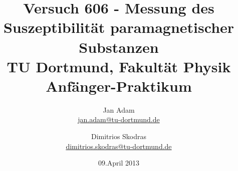 



\title{Versuch 606 - Messung des Suszeptibilität paramagnetischer Substanzen\\				%
\large TU Dortmund, Fakultät Physik\\ 
\normalsize Anfänger-Praktikum}

\author{Jan Adam\\			%
{\small \href{jan.adam@tu-dortmund.de}{jan.adam@tu-dortmund.de}}	%
\and						%
Dimitrios Skodras\\					%
{\small \href{dimitrios.skodras@tu-dortmund.de}{dimitrios.skodras@tu-dortmund.de}}		%
}
\date{09.April 2013}				%





\maketitle					%
\thispagestyle{empty} 				%



\tableofcontents


\newpage					%


